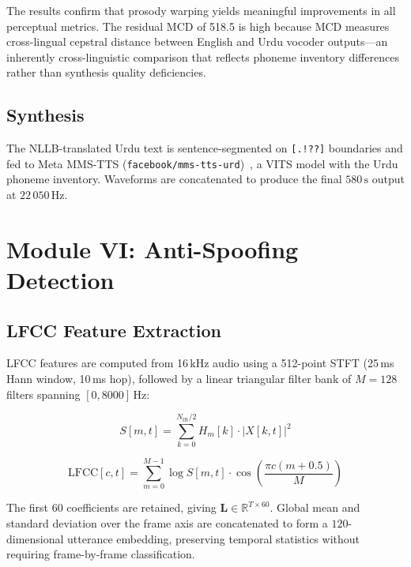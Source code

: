 \documentclass[10pt,twocolumn]{article}
\begin{document}
The results confirm that prosody warping yields meaningful improvements in all perceptual metrics. The residual MCD of 518.5 is high because MCD measures cross-lingual cepstral distance between English and Urdu vocoder outputs---an inherently cross-linguistic comparison that reflects phoneme inventory differences rather than synthesis quality deficiencies.

\subsection{Synthesis}

The NLLB-translated Urdu text is sentence-segmented on \texttt{[.!??]} boundaries and fed to Meta MMS-TTS (\texttt{facebook/mms-tts-urd})~\cite{pratap2023scaling}, a VITS model with the Urdu phoneme inventory. Waveforms are concatenated to produce the final $580\,\text{s}$ output at $22\,050\,\text{Hz}$.

\section{Module VI: Anti-Spoofing Detection}\label{sec:antispoof}

\subsection{LFCC Feature Extraction}

LFCC features are computed from 16\,kHz audio using a 512-point STFT (25\,ms Hann window, 10\,ms hop), followed by a linear triangular filter bank of $M=128$ filters spanning $[0, 8000]\,\text{Hz}$:

\begin{equation}
S[m,t] = \sum_{k=0}^{N_{\text{fft}}/2} H_m[k] \cdot |X[k,t]|^2
\label{eq:filterbank}
\end{equation}

\begin{equation}
\text{LFCC}[c,t] = \sum_{m=0}^{M-1} \log S[m,t] \cdot \cos\!\left(\frac{\pi c (m + 0.5)}{M}\right)
\label{eq:lfcc}
\end{equation}

The first 60 coefficients are retained, giving $\mathbf{L} \in \mathbb{R}^{T \times 60}$. Global mean and standard deviation over the frame axis are concatenated to form a $120$-dimensional utterance embedding, preserving temporal statistics without requiring frame-by-frame classification.
\end{document}
